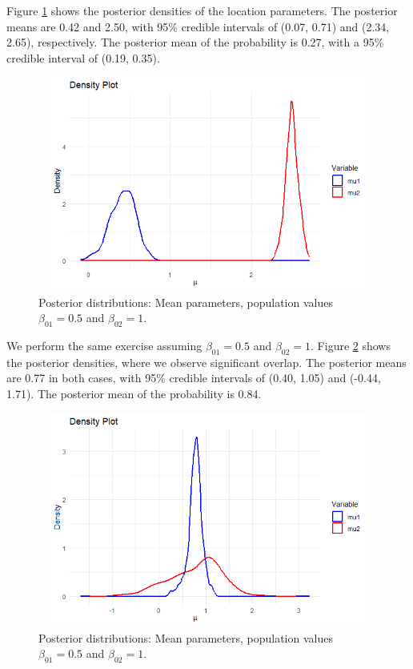 Figure \ref{figMean1} shows the posterior densities of the location parameters. The posterior means are 0.42 and 2.50, with 95\% credible intervals of (0.07, 0.71) and (2.34, 2.65), respectively. The posterior mean of the probability is 0.27, with a 95\% credible interval of (0.19, 0.35).  

\begin{figure}[!h]
	\includegraphics[width=340pt, height=200pt]{Chapters/chapter11/figures/Sim1LSI.png}
	\caption[List of figure caption goes here]{Posterior distributions: Mean parameters, population values $\beta_{01}=0.5$ and $\beta_{02}=1$.}\label{figMean1}
\end{figure}

We perform the same exercise assuming $\beta_{01}=0.5$ and $\beta_{02}=1$. Figure \ref{figMean2} shows the posterior densities, where we observe significant overlap. The posterior means are 0.77 in both cases, with 95\% credible intervals of (0.40, 1.05) and (-0.44, 1.71). The posterior mean of the probability is 0.84. 
 
\begin{figure}[!h]
	\includegraphics[width=340pt, height=200pt]{Chapters/chapter11/figures/Sim2LSI.png}
	\caption[List of figure caption goes here]{Posterior distributions: Mean parameters, population values $\beta_{01}=0.5$ and $\beta_{02}=1$.}\label{figMean2}
\end{figure}

